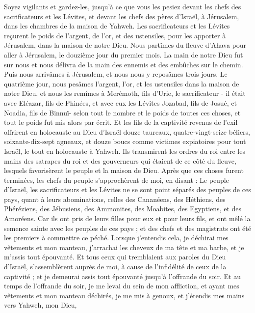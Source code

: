 \begin{multicols}{2}
Soyez vigilants et gardez-les, jusqu'à ce que vous les pesiez devant les chefs des sacrificateurs et les Lévites, et devant les chefs des pères d'Israël, à Jérusalem, dans les chambres de la maison de Yahweh.
Les sacrificateurs et les Lévites reçurent le poids de l'argent, de l'or, et des ustensiles, pour les apporter à Jérusalem, dans la maison de notre Dieu.
Nous partîmes du fleuve d'Ahava pour aller à Jérusalem, le douzième jour du premier mois. La main de notre Dieu fut sur nous et nous délivra de la main des ennemis et des  embûches sur le chemin.
Puis nous arrivâmes à Jérusalem, et nous nous y reposâmes trois jours.
Le quatrième jour, nous pesâmes l'argent, l'or, et les ustensiles dans la maison de notre Dieu, et nous les remîmes à Merémoth, fils d'Urie, le sacrificateur - il était avec Eléazar, fils de Phinées, et avec eux les Lévites Jozabad, fils de Josué, et Noadia, fils de Binnuï-
 selon tout le nombre et le poids de toutes ces choses, et tout le poids fut mis alors par écrit.
Et les fils de la captivité revenus de l’exil offrirent en holocauste au Dieu d'Israël douze taureaux, quatre-vingt-seize béliers, soixante-dix-sept agneaux, et douze boucs comme victimes expiatoires pour tout Israël, le tout en holocauste à Yahweh.
Ils transmirent les ordres du roi entre les mains des satrapes du roi et des gouverneurs qui étaient de ce côté du fleuve, lesquels favorisèrent le peuple et la maison de Dieu.
\VerseOne{}Après que ces choses furent terminées, les chefs du peuple s'approchèrent de moi, en disant : Le peuple d'Israël,  les sacrificateurs et les Lévites ne se sont point séparés des peuples de ces pays, quant à leurs abominations, celles des Cananéens, des Héthiens, des Phéréziens, des Jébusiens, des Ammonites, des Moabites, des Egyptiens, et des Amoréens.
Car ils ont pris de leurs filles pour eux et pour leurs fils, et ont mêlé la semence sainte avec les peuples de ces pays ; et des chefs et des magistrats ont été les premiers à commettre ce péché.
Lorsque j'entendis cela, je déchirai mes vêtements et mon manteau, j'arrachai les cheveux de ma tête et ma barbe, et je m'assis tout épouvanté.
Et tous ceux qui tremblaient aux paroles du Dieu d'Israël, s'assemblèrent auprès de moi, à cause de l’infidélité de ceux de la captivité ; et je demeurai assis tout épouvanté jusqu'à l'offrande du soir.
Et au temps de l'offrande du soir, je me levai du sein de mon affliction, et ayant mes vêtements et mon manteau déchirés, je me mis à genoux, et j'étendis mes mains vers Yahweh, mon Dieu,

\end{multicols}
